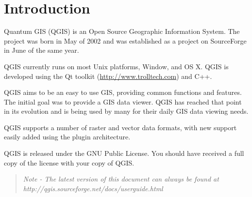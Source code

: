 \chapter{Introduction}
Quantum GIS (QGIS) is an Open Source Geographic Information System. The project
was born in May of 2002 and was established as a project on SourceForge in June
of the same year. 

QGIS currently runs on most Unix platforms, Window, and OS X. QGIS is developed
using the Qt toolkit (\url{http://www.trolltech.com}) and C++.

QGIS aims to be an easy to use GIS, providing common functions and features.
The initial goal was to provide a GIS data viewer. QGIS has reached that point
in its evolution and is being used by many for their daily GIS data viewing
needs. 

QGIS supports a number of raster and vector data formats, with new support
easily added using the plugin architecture. 

QGIS is released under the GNU Public License. You should have received a full
copy of the license with your copy of QGIS.  
\begin{quote}
\begin{singlespace}
\textsl{Note - The latest version of this document can always be found at\\
http://qgis.sourceforge.net/docs/userguide.html }
\end{singlespace}
\end{quote}
